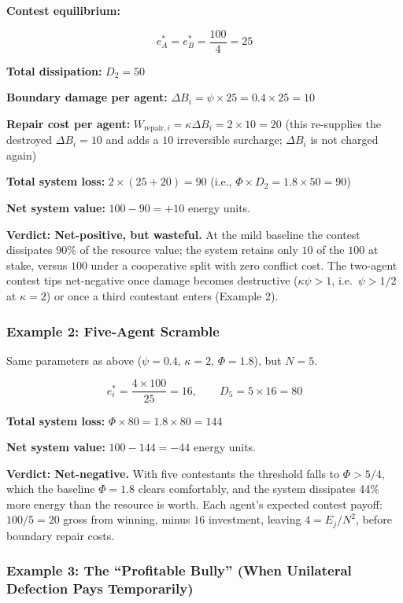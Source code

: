 \documentclass[11pt]{article}
\theoremstyle{plain}
\theoremstyle{definition}
\theoremstyle{remark}
\let\origsubsubsection\subsubsection
\renewcommand{\subsubsection}{\needspace{4\baselineskip}\origsubsubsection}
\begin{document}
\textbf{Contest equilibrium:}

\[e_A^* = e_B^* = \frac{100}{4} = 25\]

\textbf{Total dissipation:} \(D_2 = 50\)

\textbf{Boundary damage per agent:}
\(\Delta B_i = \psi \times 25 = 0.4 \times 25 = 10\)

\textbf{Repair cost per agent:}
\(W_{\text{repair},i} = \kappa \Delta B_i = 2 \times 10 = 20\) (this
re-supplies the destroyed \(\Delta B_i = 10\) and adds a \(10\)
irreversible surcharge; \(\Delta B_i\) is not charged again)

\textbf{Total system loss:} \(2 \times (25 + 20) = 90\) (i.e.,
\(\Phi \times D_2 = 1.8 \times 50 = 90\))

\textbf{Net system value:} \(100 - 90 = +10\) energy units.

\textbf{Verdict: Net-positive, but wasteful.} At the mild baseline the
contest dissipates 90\% of the resource value; the system retains only
\(10\) of the \(100\) at stake, versus \(100\) under a cooperative split
with zero conflict cost. The two-agent contest tips net-negative once
damage becomes destructive (\(\kappa\psi > 1\), i.e.~\(\psi > 1/2\) at
\(\kappa = 2\)) or once a third contestant enters (Example 2).

\subsubsection{Example 2: Five-Agent
Scramble}\label{example-2-five-agent-scramble}

Same parameters as above (\(\psi = 0.4\), \(\kappa = 2\),
\(\Phi = 1.8\)), but \(N = 5\).

\[e_i^* = \frac{4 \times 100}{25} = 16, \qquad D_5 = 5 \times 16 = 80\]

\textbf{Total system loss:} \(\Phi \times 80 = 1.8 \times 80 = 144\)

\textbf{Net system value:} \(100 - 144 = -44\) energy units.

\textbf{Verdict: Net-negative.} With five contestants the threshold
falls to \(\Phi > 5/4\), which the baseline \(\Phi = 1.8\) clears
comfortably, and the system dissipates 44\% more energy than the
resource is worth. Each agent's expected contest payoff: \(100/5 = 20\)
gross from winning, minus \(16\) investment, leaving \(4 = E_j/N^2\),
before boundary repair costs.

\subsubsection{Example 3: The ``Profitable Bully'' (When Unilateral
Defection Pays
Temporarily)}\label{example-3-the-profitable-bully-when-unilateral-defection-pays-temporarily}
\end{document}
